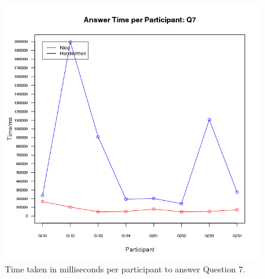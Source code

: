 \documentclass[12pt,twoside,notitlepage,xetex]{report}
\begin{document}
{\begin{center}
\begin{figure}[H]
\begin{center}
\includegraphics[height=\textheight/2-2cm]{figs/graphs/q7.png}
\end{center}
\caption{Time taken in milliseconds per participant to answer Question 7.}
\end{figure}
\end{center}

}
\end{document}
